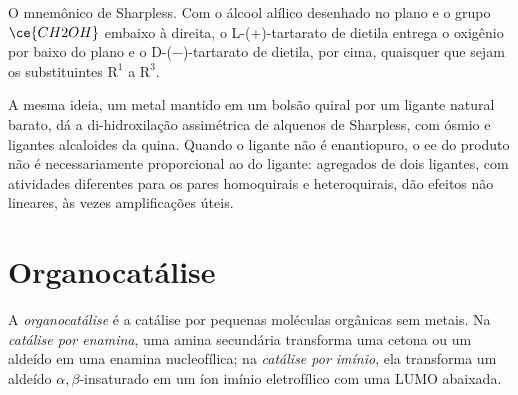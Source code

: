\begin{omfigure}

{\small O mnemônico de Sharpless. Com o álcool alílico desenhado no plano e o
grupo $\ce{CH2OH}$ embaixo à direita, o L-($+$)-tartarato de dietila entrega o oxigênio por
baixo do plano e o D-($-$)-tartarato de dietila, por cima, quaisquer que sejam os
substituintes $\mathrm R^1$ a $\mathrm R^3$.}
\end{omfigure}

A mesma ideia, um metal mantido em um bolsão quiral por um ligante natural barato, dá
a di-hidroxilação assimétrica de alquenos de Sharpless, com ósmio e ligantes alcaloides
da quina. Quando o ligante não é enantiopuro, o ee do produto
não é necessariamente proporcional ao do ligante: agregados de dois ligantes, com
atividades diferentes para os pares homoquirais e heteroquirais, dão efeitos não
lineares, às vezes amplificações úteis.

\section{Organocatálise}

\begin{definition}[Organocatálise]\label{def:b3:asymmetric-synthesis:organocatalysis}
A \emph{organocatálise} é a catálise por pequenas moléculas
orgânicas sem metais. Na \emph{catálise por enamina}, uma
amina secundária transforma uma cetona ou um aldeído em uma enamina nucleofílica; na
\emph{catálise por imínio}, ela transforma um aldeído $\alpha,\beta$-insaturado
em um íon imínio eletrofílico com uma LUMO abaixada.
\end{definition}

